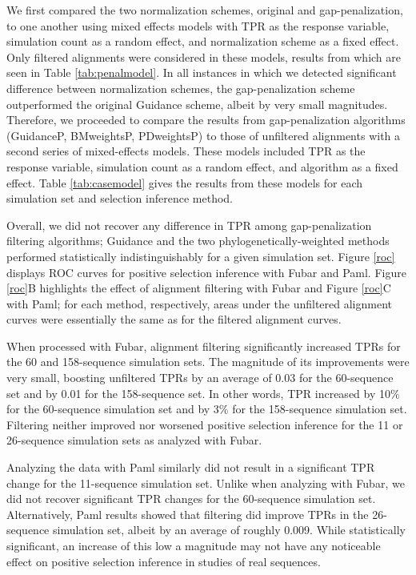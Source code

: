 \documentclass[10pt]{article}
\begin{document}
We first compared the two normalization schemes, original and gap-penalization, to one another using mixed effects models with TPR as the response variable, simulation count as a random effect, and normalization scheme as a fixed effect. Only filtered alignments were considered in these models, results from which are seen in Table \ref{tab:penalmodel}. In all instances in which we detected significant difference between normalization schemes, the gap-penalization scheme outperformed the original Guidance scheme, albeit by very small magnitudes. Therefore, we proceeded to compare the results from gap-penalization algorithms (GuidanceP, BMweightsP, PDweightsP) to those of unfiltered alignments with a second series of mixed-effects models. These models included TPR as the response variable, simulation count as a random effect, and algorithm as a fixed effect. Table \ref{tab:casemodel} gives the results from these models for each simulation set and selection inference method.

Overall, we did not recover any difference in TPR among gap-penalization filtering algorithms; Guidance and the two phylogenetically-weighted methods performed statistically indistinguishably for a given simulation set. Figure \ref{roc} displays ROC curves for positive selection inference with Fubar and Paml. Figure \ref{roc}B highlights the effect of alignment filtering with Fubar and Figure \ref{roc}C with Paml; for each method, respectively, areas under the unfiltered alignment curves were essentially the same as for the filtered alignment curves.

When processed with Fubar, alignment filtering significantly increased TPRs for the 60 and 158-sequence simulation sets. The magnitude of its improvements were very small, boosting unfiltered TPRs by an average of 0.03 for the 60-sequence set and by 0.01 for the 158-sequence set. In other words, TPR increased by 10\% for the 60-sequence simulation set and by 3\% for the 158-sequence simulation set. Filtering neither improved nor worsened positive selection inference for the 11 or 26-sequence simulation sets as analyzed with Fubar.

Analyzing the data with Paml similarly did not result in a significant TPR change for the 11-sequence simulation set. Unlike when analyzing with Fubar, we did not recover significant TPR changes for the 60-sequence simulation set. Alternatively, Paml results showed that filtering did improve TPRs in the 26-sequence simulation set, albeit by an average of roughly 0.009. While statistically significant, an increase of this low a magnitude may not have any noticeable effect on positive selection inference in studies of real sequences. 
\end{document}
